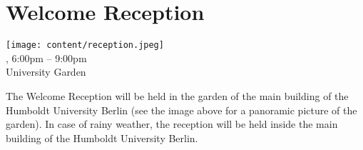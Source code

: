 \clearpage
\section[Welcome Reception]{Welcome Reception}
\setheaders{}{\daydateyear}

\begin{center}

 \texttt{[image: content/reception.jpeg]} \\

\daydateyear, 6:00pm -- 9:00pm \vspace{1em}\\
University Garden \\
\end{center}

The Welcome Reception will be held in the garden of the main building of the Humboldt University Berlin (see the image above for a panoramic picture of the garden). In case of rainy weather, the reception will be held inside the main building of the Humboldt University Berlin.

